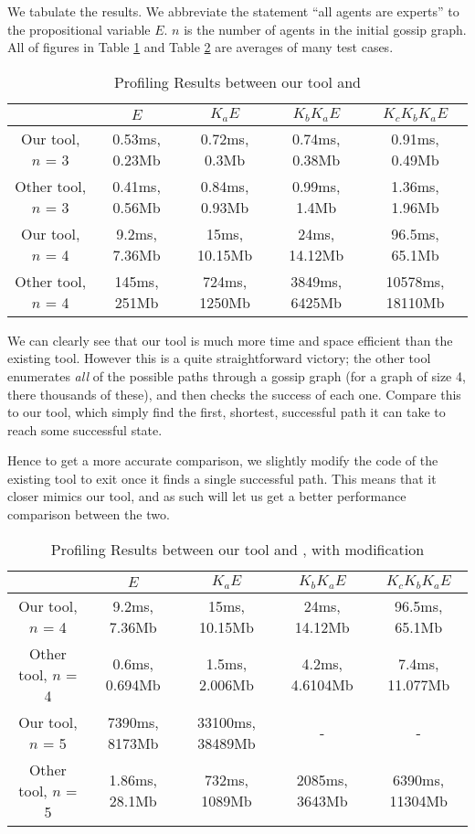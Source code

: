 \documentclass[10pt, a4paper]{report}
\begin{document}
We tabulate the results. We abbreviate the statement ``all agents are
experts'' to the propositional variable $E$. $n$ is the number of agents in the
initial gossip graph. All of figures in Table \ref{tab:Proflining1} and Table
\ref{tab:Proflining2} are averages of many test cases. 

\begin{table}[h]
  \centering
  \begin{tabular}{|c||c|c|c|c|}
    \hline
    & $E$ & $ K_a E$ & $K_b K_a E$ & $K_c K_b K_a E$ \\ \hline 
    Our tool, $n$ = 3 & 0.53ms, 0.23Mb & 0.72ms, 0.3Mb & 0.74ms, 0.38Mb & 0.91ms, 0.49Mb \\ \hline
    Other tool, $n$ = 3 & 0.41ms, 0.56Mb & 0.84ms, 0.93Mb & 0.99ms, 1.4Mb & 1.36ms, 1.96Mb \\ \hline \hline
    Our tool, $n$ = 4   & 9.2ms, 7.36Mb & 15ms, 10.15Mb & 24ms, 14.12Mb & 96.5ms, 65.1Mb \\ \hline
    Other tool, $n$ = 4 & 145ms, 251Mb & 724ms, 1250Mb & 3849ms, 6425Mb & 10578ms, 18110Mb \\ 
    \hline
  \end{tabular}
  \caption{Profiling Results between our tool and \cite{GithubGossip}}
  \label{tab:Proflining1}
\end{table}

We can clearly see that our tool is much more time and space efficient than the
existing tool. However this is a quite straightforward victory; the other tool
enumerates \emph{all} of the possible paths through a gossip graph (for a
graph of size 4, there thousands of these), and then checks the success of each
one. Compare this to our tool, which simply find the first, shortest, successful
path it can take to reach some successful state.

Hence to get a more accurate comparison, we slightly modify the code of the
existing tool to exit once it finds a single successful path. This means that it
closer mimics our tool, and as such will let us get a better performance
comparison between the two. 


\begin{table}[h]
  \centering
  \begin{tabular}{|c||c|c|c|c|}
    \hline
    & $E$ & $ K_a E$ & $K_b K_a E$ & $K_c K_b K_a E$ \\ \hline 
    Our tool, $n$ = 4 & 9.2ms, 7.36Mb & 15ms, 10.15Mb & 24ms, 14.12Mb & 96.5ms, 65.1Mb \\ \hline
    Other tool, $n$ = 4 & 0.6ms, 0.694Mb & 1.5ms, 2.006Mb & 4.2ms, 4.6104Mb & 7.4ms, 11.077Mb \\ \hline \hline
    Our tool, $n$ = 5 & 7390ms, 8173Mb & 33100ms, 38489Mb & - & - \\ \hline
    Other tool, $n$ = 5 & 1.86ms, 28.1Mb & 732ms, 1089Mb & 2085ms, 3643Mb & 6390ms, 11304Mb \\
    \hline
  \end{tabular}
  \caption{Profiling Results between our tool and \cite{GithubGossip}, with modification}
  \label{tab:Proflining2}
\end{table}
\end{document}
